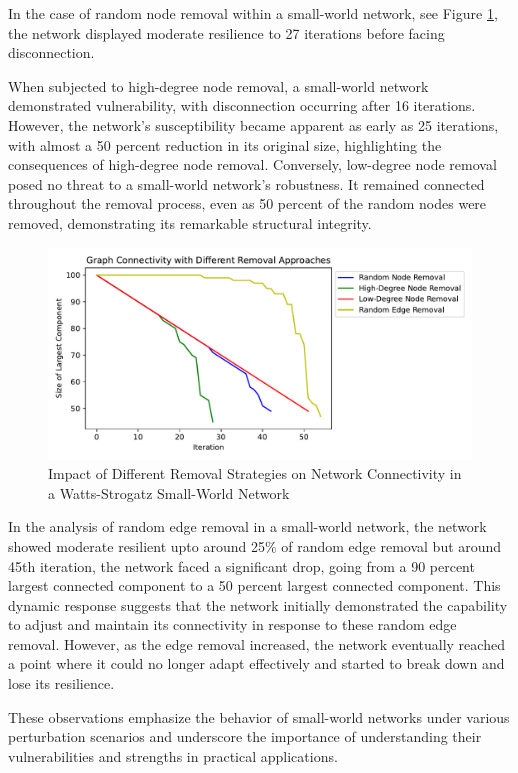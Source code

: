 \documentclass[conference]{IEEEtran} %
\begin{document}
In the case of random node removal within a small-world network, see Figure \ref{fig:12.3}, the network displayed moderate resilience to 27 iterations before facing disconnection.

When subjected to high-degree node removal, a small-world network demonstrated vulnerability, with disconnection occurring after 16 iterations. However, the network's susceptibility became apparent as early as 25 iterations, with almost a 50 percent reduction in its original size, highlighting the consequences of high-degree node removal. Conversely, low-degree node removal posed no threat to a small-world network's robustness. It remained connected throughout the removal process, even as 50 percent of the random nodes were removed, demonstrating its remarkable structural integrity.

\begin{figure}[t]
  \centering
  \includegraphics[width=1\linewidth]{small_world_network_connectivity_plot.pdf}
  \caption{Impact of Different Removal Strategies on Network Connectivity in a Watts-Strogatz Small-World Network}
  \label{fig:12.3}
\end{figure}

In the analysis of random edge removal in a small-world network, the network showed moderate resilient upto around 25\% of random edge removal but around 45th iteration, the network faced a significant drop, going from a 90 percent largest connected component to a 50 percent largest connected component. This dynamic response suggests that the network initially demonstrated the capability to adjust and maintain its connectivity in response to these random edge removal. However, as the edge removal increased, the network eventually reached a point where it could no longer adapt effectively and started to break down and lose its resilience.

These observations emphasize the behavior of small-world networks under various perturbation scenarios and underscore the importance of understanding their vulnerabilities and strengths in practical applications.
\end{document}
